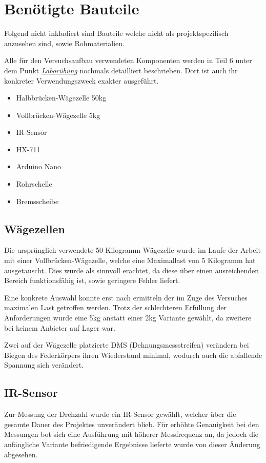 \section{Benötigte Bauteile}

Folgend nicht inkludiert sind Bauteile welche nicht als projektspezifisch anzusehen sind, sowie Rohmaterialien.

Alle für den Versuchsaufbau verwendeten Komponenten werden in Teil 6 unter dem Punkt \hyperref[labuebung]{\textit{Laborübung}} nochmals detailliert beschrieben.
Dort ist auch ihr konkreter Verwendungszweck exakter ausgeführt.

\begin{itemize}
    \item Halbbrücken-Wägezelle 50kg
    \item Vollbrücken-Wägezelle 5kg
    \item IR-Sensor
    \item HX-711
    \item Arduino Nano
    \item Rohrschelle
    \item Bremsscheibe
\end{itemize}

\subsection{Wägezellen}

Die ursprünglich verwendete 50 Kilogramm Wägezelle wurde im Laufe der Arbeit mit einer Vollbrücken-Wägezelle, welche eine Maximallast von 5 Kilogramm hat ausgetauscht.
Dies wurde als sinnvoll erachtet, da diese über einen ausreichenden Bereich funktionsfähig ist, sowie geringere Fehler liefert.

Eine konkrete Auswahl konnte erst nach ermitteln der im Zuge des Versuches maximalen Last getroffen werden.
Trotz der schlechteren Erfüllung der Anforderungen wurde eine 5kg anstatt einer 2kg Variante gewählt, da zweitere bei keinem Anbieter auf Lager war.

Zwei auf der Wägezelle platzierte DMS (Dehnungsmessstreifen) verändern bei Biegen des Federkörpers ihren Wiederstand minimal, wodurch auch die abfallende Spannung sich verändert.

\subsection{IR-Sensor}

Zur Messung der Drehzahl wurde ein IR-Sensor gewählt, welcher über die gesamte Dauer des Projektes unverändert blieb.
Für erhöhte Genauigkeit bei den Messungen bot sich eine Ausführung mit höherer Messfrequenz an, da jedoch die anfängliche Variante befriedigende Ergebnisse lieferte wurde von dieser Änderung abgesehen.

